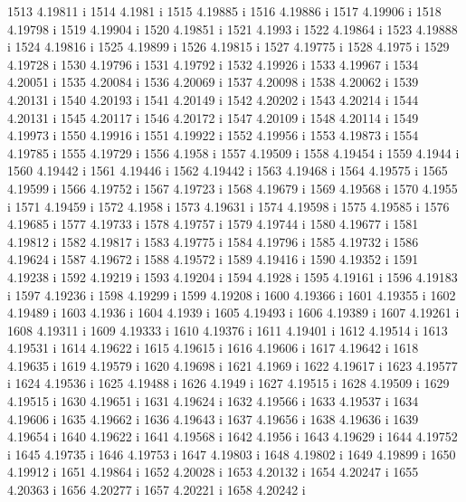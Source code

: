  1513  4.19811  i
 1514  4.1981  i
 1515  4.19885  i
 1516  4.19886  i
 1517  4.19906  i
 1518  4.19798  i
 1519  4.19904  i
 1520  4.19851  i
 1521  4.1993  i
 1522  4.19864  i
 1523  4.19888  i
 1524  4.19816  i
 1525  4.19899  i
 1526  4.19815  i
 1527  4.19775  i
 1528  4.1975  i
 1529  4.19728  i
 1530  4.19796  i
 1531  4.19792  i
 1532  4.19926  i
 1533  4.19967  i
 1534  4.20051  i
 1535  4.20084  i
 1536  4.20069  i
 1537  4.20098  i
 1538  4.20062  i
 1539  4.20131  i
 1540  4.20193  i
 1541  4.20149  i
 1542  4.20202  i
 1543  4.20214  i
 1544  4.20131  i
 1545  4.20117  i
 1546  4.20172  i
 1547  4.20109  i
 1548  4.20114  i
 1549  4.19973  i
 1550  4.19916  i
 1551  4.19922  i
 1552  4.19956  i
 1553  4.19873  i
 1554  4.19785  i
 1555  4.19729  i
 1556  4.1958  i
 1557  4.19509  i
 1558  4.19454  i
 1559  4.1944  i
 1560  4.19442  i
 1561  4.19446  i
 1562  4.19442  i
 1563  4.19468  i
 1564  4.19575  i
 1565  4.19599  i
 1566  4.19752  i
 1567  4.19723  i
 1568  4.19679  i
 1569  4.19568  i
 1570  4.1955  i
 1571  4.19459  i
 1572  4.1958  i
 1573  4.19631  i
 1574  4.19598  i
 1575  4.19585  i
 1576  4.19685  i
 1577  4.19733  i
 1578  4.19757  i
 1579  4.19744  i
 1580  4.19677  i
 1581  4.19812  i
 1582  4.19817  i
 1583  4.19775  i
 1584  4.19796  i
 1585  4.19732  i
 1586  4.19624  i
 1587  4.19672  i
 1588  4.19572  i
 1589  4.19416  i
 1590  4.19352  i
 1591  4.19238  i
 1592  4.19219  i
 1593  4.19204  i
 1594  4.1928  i
 1595  4.19161  i
 1596  4.19183  i
 1597  4.19236  i
 1598  4.19299  i
 1599  4.19208  i
 1600  4.19366  i
 1601  4.19355  i
 1602  4.19489  i
 1603  4.1936  i
 1604  4.1939  i
 1605  4.19493  i
 1606  4.19389  i
 1607  4.19261  i
 1608  4.19311  i
 1609  4.19333  i
 1610  4.19376  i
 1611  4.19401  i
 1612  4.19514  i
 1613  4.19531  i
 1614  4.19622  i
 1615  4.19615  i
 1616  4.19606  i
 1617  4.19642  i
 1618  4.19635  i
 1619  4.19579  i
 1620  4.19698  i
 1621  4.1969  i
 1622  4.19617  i
 1623  4.19577  i
 1624  4.19536  i
 1625  4.19488  i
 1626  4.1949  i
 1627  4.19515  i
 1628  4.19509  i
 1629  4.19515  i
 1630  4.19651  i
 1631  4.19624  i
 1632  4.19566  i
 1633  4.19537  i
 1634  4.19606  i
 1635  4.19662  i
 1636  4.19643  i
 1637  4.19656  i
 1638  4.19636  i
 1639  4.19654  i
 1640  4.19622  i
 1641  4.19568  i
 1642  4.1956  i
 1643  4.19629  i
 1644  4.19752  i
 1645  4.19735  i
 1646  4.19753  i
 1647  4.19803  i
 1648  4.19802  i
 1649  4.19899  i
 1650  4.19912  i
 1651  4.19864  i
 1652  4.20028  i
 1653  4.20132  i
 1654  4.20247  i
 1655  4.20363  i
 1656  4.20277  i
 1657  4.20221  i
 1658  4.20242  i
